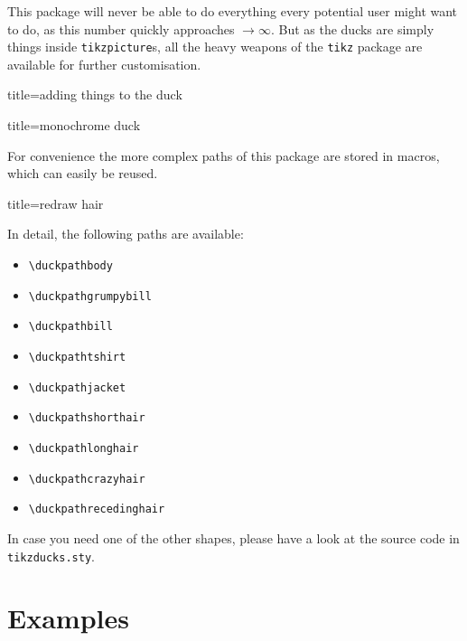 \documentclass{scrartcl}
\begin{document}
This package will never be able to do everything every potential user might want to do, as this number quickly approaches $\rightarrow \infty$. But as the ducks are simply things inside \verb|tikzpicture|s, all the heavy weapons of the \verb|tikz| package are available for further customisation.

\begin{tcblisting}{title={adding things to the duck}}
\end{tcblisting}


\begin{tcblisting}{title={monochrome duck}}
\end{tcblisting}

For convenience the more complex paths of this package are stored in macros, which can easily be reused. 

\begin{tcblisting}{title={redraw hair}}
\begin{tikzpicture}
\duck
\path[preaction={fill, blue!50!black},pattern=fivepointed stars, pattern color=white]  
\duckpathlonghair;
\end{tikzpicture}
\end{tcblisting}

In detail, the following paths are available:
\begin{itemize}
\item \verb|\duckpathbody|
\item \verb|\duckpathgrumpybill|
\item \verb|\duckpathbill|
\item \verb|\duckpathtshirt|
\item \verb|\duckpathjacket|
\item \verb|\duckpathshorthair|
\item \verb|\duckpathlonghair|
\item \verb|\duckpathcrazyhair|
\item \verb|\duckpathrecedinghair|
\end{itemize}

In case you need one of the other shapes, please have a look at the source code in \verb|tikzducks.sty|.

\section{Examples}
\end{document}
